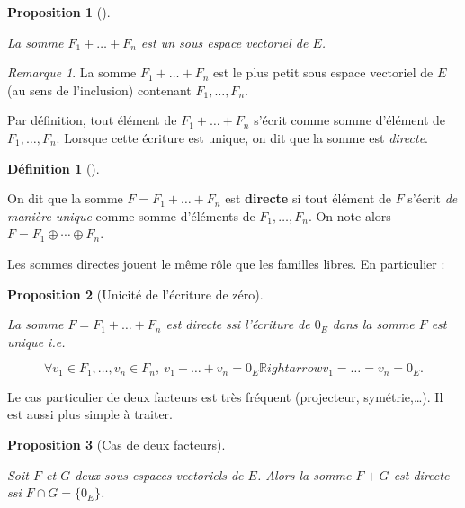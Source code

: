 \documentclass[
  french,
  letterpaper,
  DIV=11,
  numbers=noendperiod]{scrreprt}
\theoremstyle{plain}
\theoremstyle{definition}
\newtheorem{definition}{Définition}[chapter]
\theoremstyle{plain}
\newtheorem{proposition}{Proposition}[chapter]
\theoremstyle{plain}
\theoremstyle{definition}
\theoremstyle{definition}
\theoremstyle{plain}
\theoremstyle{remark}
\newtheorem{refremark}{Remarque}[chapter]
\begin{document}
\begin{proposition}[]\protect\hypertarget{prp-somme}{}\label{prp-somme}

La somme \(F_{1}+\dots +F_{n}\) est un sous espace vectoriel de \(E\).

\end{proposition}

\begin{refremark}
La somme \(F_{1}+ \dots + F_{n}\) est le plus petit sous espace
vectoriel de \(E\) (au sens de l'inclusion) contenant
\(F_{1},\dots,F_{n}\).

\label{rem-somme}

\end{refremark}

Par définition, tout élément de \(F_{1}+ \dots + F_{n}\) s'écrit comme
somme d'élément de \(F_{1},\dots,F_{n}\). Lorsque cette écriture est
unique, on dit que la somme est \emph{directe}.

\begin{definition}[]\protect\hypertarget{def-somme-directe}{}\label{def-somme-directe}

On dit que la somme \(F = F_{1}+ \dots + F_{n}\) est \textbf{directe} si
tout élément de \(F\) s'écrit \emph{de manière unique} comme somme
d'éléments de \(F_{1},\dots,F_{n}\). On note alors
\(F = F_{1}\oplus \cdots \oplus F_{n}\).

\end{definition}

Les sommes directes jouent le même rôle que les familles libres. En
particulier :

\begin{proposition}[Unicité de l'écriture de
zéro]\protect\hypertarget{prp-unicite-ecriture-zero}{}\label{prp-unicite-ecriture-zero}

La somme \(F = F_{1}+ \dots + F_{n}\) est directe ssi l'écriture de
\(0_{E}\) dans la somme \(F\) est unique i.e.~

\[
    \forall v_{1} \in F_{1},\dots, v_{n} \in F_{n},\ v_{1}+\dots + v_{n} =
0_{E} \mathbb{R}ightarrow v_{1}= \dots = v_{n}=0_{E}.
\]

\end{proposition}

Le cas particulier de deux facteurs est très fréquent (projecteur,
symétrie,\ldots). Il est aussi plus simple à traiter.

\begin{proposition}[Cas de deux
facteurs]\protect\hypertarget{prp-deux-facteurs}{}\label{prp-deux-facteurs}

Soit \(F\) et \(G\) deux sous espaces vectoriels de \(E\). Alors la
somme \(F + G\) est directe ssi \(F \cap G = \{0_E\}\).

\end{proposition}
\end{document}
